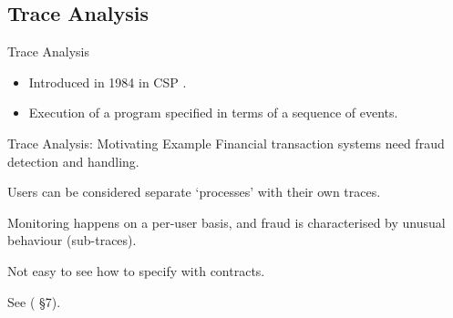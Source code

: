 \documentclass[12pt]{beamer}
\begin{document}

\subsection{Trace Analysis}
\label{sec:runver-trace}

\begin{frame}{Trace Analysis}


  \begin{itemize}
    \item Introduced in 1984 in CSP \parencite{cspthy}.
    \item Execution of a program specified in terms of a sequence of events.
  \end{itemize}

\end{frame}

\begin{frame}{Trace Analysis: \small Motivating Example}
  Financial transaction systems need fraud detection and handling.

  \vspace{0.25cm}

  Users can be considered separate `processes' with their own traces.

  \vspace{0.25cm}

  Monitoring happens on a per-user basis, and fraud is characterised
  by unusual behaviour (sub-traces).

  \vspace{0.25cm}

  Not easy to see how to specify with contracts.

  \vspace{0.25cm}

  See (\cite{compensate} \S7).

\end{frame}
\end{document}
